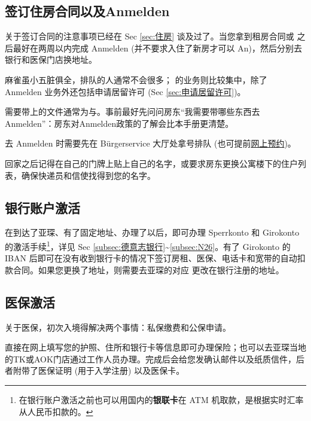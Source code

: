   \subsection{签订住房合同以及Anmelden}\label{subsec:签订住房合同以及Anmelden}

    关于签订合同的注意事项已经在 Sec \ref{sec:住房} 谈及过了。当您拿到租房合同或 之后最好在两周以内完成 Anmelden (并不要求入住了新房才可以 An)，然后分别去银行和医保门店换地址。

     麻雀虽小五脏俱全，排队的人通常不会很多； 的业务则比较集中，除了 Anmelden 业务外还包括申请居留许可 (Sec \ref{sec:申请居留许可})。

    需要带上的文件通常为与。事前最好先问问房东``我需要带哪些东西去Anmelden''：房东对Anmelden政策的了解会比本手册更清楚。

    去 Anmelden 时需要先在 Bürgerservice 大厅处拿号排队 (也可提前\href{https://www.qtermin.de/bahnhofplatzkatschhof}{网上预约})。

    回家之后记得在自己的门牌上贴上自己的名字，或要求房东更换公寓楼下的住户列表，确保快递员和信使找得到您的名字。

  \subsection{银行账户激活}\label{subsec:银行账户激活}

    在到达了亚琛、有了固定地址、办理了以后，即可办理 Sperrkonto 和 Girokonto 的激活手续\footnote{在银行账户激活之前也可以用国内的\textbf{银联卡}在 ATM 机取款，是根据实时汇率从人民币扣款的。}，详见 Sec \ref{subsec:德意志银行}\textasciitilde\ref{subsec:N26}。有了 Girokonto 的 IBAN 后即可在没有收到银行卡的情况下签订房租、医保、电话卡和宽带的自动扣款合同。如果您更换了地址，则需要去亚琛的对应 更改在银行注册的地址。

  \subsection{医保激活}\label{subsec:医保激活}

    关于医保，初次入境得解决两个事情：私保缴费和公保申请。

    直接在网上填写您的护照、住所和银行卡等信息即可办理保险；也可以去亚琛当地的TK或AOK门店通过工作人员办理。完成后会给您发确认邮件以及纸质信件，后者附带了医保证明 (用于入学注册) 以及医保卡。

